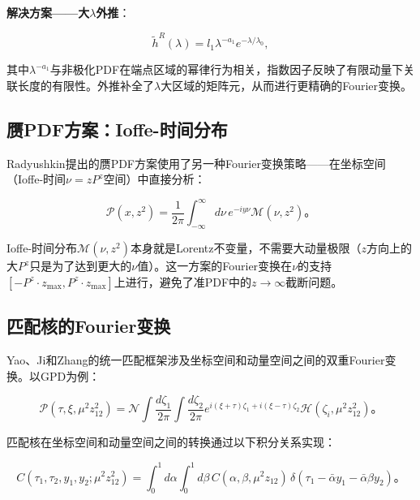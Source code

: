 \documentclass[12pt,a4paper]{ctexart}
\theoremstyle{definition}
\begin{document}
\textbf{解决方案——大$\lambda$外推}\cite{Chen2025gluon,Ji2021hybrid}：

\begin{equation}
\tilde{h}^R(\lambda) = l_1 \lambda^{-a_1} e^{-\lambda/\lambda_0},
\label{eq:lambda_extrap}
\end{equation}

其中$\lambda^{-a_1}$与非极化PDF在端点区域的幂律行为相关，指数因子反映了有限动量下关联长度的有限性。外推补全了$\lambda$大区域的矩阵元，从而进行更精确的Fourier变换。

\subsection{赝PDF方案：Ioffe-时间分布}

Radyushkin提出的赝PDF方案\cite{Radyushkin2018one_loop}使用了另一种Fourier变换策略——在坐标空间（Ioffe-时间$\nu = zP^z$空间）中直接分析：

\begin{equation}
\boxed{\mathcal{P}(x, z^2) = \frac{1}{2\pi} \int_{-\infty}^{\infty} d\nu \, e^{-iy\nu} \mathcal{M}(\nu, z^2)}。
\label{eq:pseudo_fourier}
\end{equation}

Ioffe-时间分布$\mathcal{M}(\nu, z^2)$本身就是Lorentz不变量，不需要大动量极限（$z$方向上的大$P^z$只是为了达到更大的$\nu$值）。这一方案的Fourier变换在$\nu$的支持$[-P^z \cdot z_{\text{max}}, P^z \cdot z_{\text{max}}]$上进行，避免了准PDF中的$z \to \infty$截断问题。

\subsection{匹配核的Fourier变换}

Yao、Ji和Zhang\cite{Yao2023}的统一匹配框架涉及坐标空间和动量空间之间的双重Fourier变换。以GPD为例\cite{Yao2023}：

\begin{equation}
\mathcal{P}(\tau, \xi, \mu^2 z^2_{12}) = \mathcal{N} \int \frac{d\zeta_1}{2\pi} \int \frac{d\zeta_2}{2\pi} e^{i(\xi+\tau)\zeta_1 + i(\xi-\tau)\zeta_2} \mathcal{H}(\zeta_i, \mu^2 z^2_{12})。
\label{eq:GPD_fourier}
\end{equation}

匹配核在坐标空间和动量空间之间的转换通过以下积分关系实现\cite{Yao2023}：

\begin{equation}
C(\tau_1, \tau_2, y_1, y_2; \mu^2 z^2_{12}) = \int_0^1 d\alpha \int_0^1 d\beta \, C(\alpha, \beta, \mu^2 z_{12}) \, \delta(\tau_1 - \bar{\alpha}y_1 - \bar{\alpha}\beta y_2)。
\label{eq:matching_fourier}
\end{equation}
\end{document}
